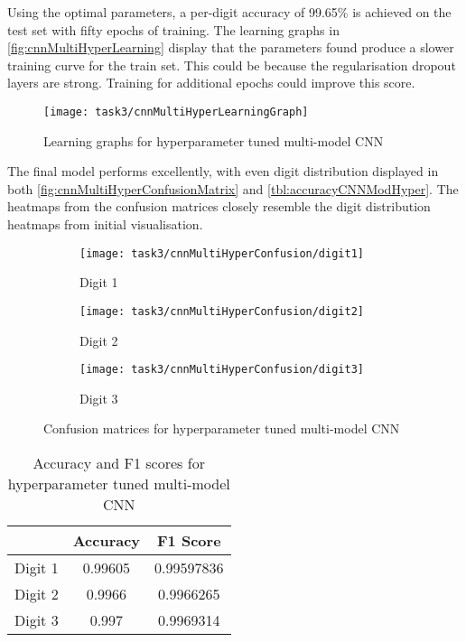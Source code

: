 Using the optimal parameters, a per-digit accuracy of 99.65\% is achieved on the test set with fifty epochs of training. The learning graphs in \autoref{fig:cnnMultiHyperLearning} display that the parameters found produce a slower training curve for the train set. This could be because the regularisation dropout layers are strong. Training for additional epochs could improve this score.

\begin{figure}[!htbp]
    \centering
    \texttt{[image: task3/cnnMultiHyperLearningGraph]}
    \caption[Learning graphs for hyperparameter tuned multi-model CNN]
    {Learning graphs for hyperparameter tuned multi-model CNN}
    \label{fig:cnnMultiHyperLearning}
\end{figure}

The final model performs excellently, with even digit distribution displayed in both \autoref{fig:cnnMultiHyperConfusionMatrix} and \autoref{tbl:accuracyCNNModHyper}. The heatmaps from the confusion matrices closely resemble the digit distribution heatmaps from initial visualisation.

\begin{figure}[!htbp]
    \centering
    \begin{subfigure}{0.3\textwidth}
        \texttt{[image: task3/cnnMultiHyperConfusion/digit1]}
        \caption{Digit 1}
        \label{fig:cnnMultiHyperConfusionMatrix1}
    \end{subfigure}
    \begin{subfigure}{0.3\textwidth}
        \texttt{[image: task3/cnnMultiHyperConfusion/digit2]}
        \caption{Digit 2}
        \label{fig:cnnMultiHyperConfusionMatrix2}
    \end{subfigure}
    \begin{subfigure}{0.3\textwidth}
        \texttt{[image: task3/cnnMultiHyperConfusion/digit3]}
        \caption{Digit 3}
        \label{fig:cnnMultiHyperConfusionMatrix3}
    \end{subfigure}
    \caption{Confusion matrices for hyperparameter tuned multi-model CNN}
    \label{fig:cnnMultiHyperConfusionMatrix}
\end{figure}

\bgroup
    \begin{table}[!htbp]
        \centering
        \begin{tabular}{l|cc}
            \hline
            & Accuracy & F1 Score \\ \hline
            Digit 1 & 0.99605 & 0.99597836 \\
            Digit 2 & 0.9966 & 0.9966265 \\
            Digit 3 & 0.997 & 0.9969314 \\        
        \end{tabular}
        \caption{Accuracy and F1 scores for hyperparameter tuned multi-model CNN}
        \label{tbl:accuracyCNNMultiHyper}
    \end{table}
\egroup


